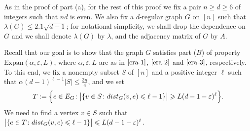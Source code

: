 \documentclass[11pt,leqno]{amsart}
\theoremstyle{remark}
\theoremstyle{plain}
\def\dist{{\rm dist}}
\def\dist{{\rm dist}}
\begin{document}
As in the proof of part (a), for the rest of this proof we fix a pair $n\geqslant d\geqslant 6$ of integers such that $nd$ is even.
We also fix a $d$-regular graph $G$ on $[n]$ such that $\lambda(G)\leqslant 2.1\sqrt{d-1}$;
for notational simplicity, we shall drop the dependence on $G$ and we shall denote $\lambda(G)$ by $\lambda$,
and the adjacency matrix of $G$ by $A$.

Recall that our goal is to show that the graph $G$ satisfies part (\hyperref[Part-B]{$B$}) of property
$\mathrm{Expan}(\alpha,\varepsilon,L)$, where $\alpha,\varepsilon,L$ are as in $\eqref{era-1}$,
$\eqref{era-2}$ and $\eqref{era-3}$, respectively. To this end, we fix a nonempty subset $S$ of $[n]$ and a
positive integer $\ell$ such that $\alpha (d-1)^{\ell-1}|S|\leqslant \frac{3n}{4}$, and we set
\[ T:=\Big\{e\in E_G\colon \big|\{v\in S\colon \dist_G(v,e)\leqslant \ell-1\}\big|\geqslant L(d-1-\varepsilon)^\ell\Big\}. \]
We need to find a vertex $v\in S$ such that
$\big|\{e\in T\colon \dist_G(v,e)\leqslant \ell-1\}\big|\leqslant L(d-1-\varepsilon)^\ell$.
\end{document}

